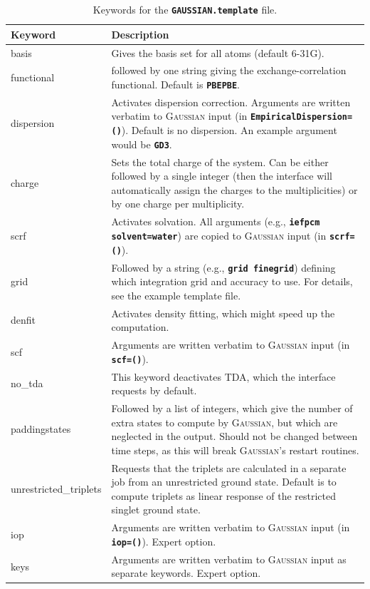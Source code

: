 \documentclass[a4paper,10pt,DIV=15,openany]{scrbook}
\newcommand{\ttt}[1]{\textbf{\texttt{#1}}}
\begin{document}
\begin{table}
  \centering
  \caption{Keywords for the \ttt{GAUSSIAN.template} file.}
  \label{tab:gauss_temp}
  \small
  \begin{tabular}{>{\ttfamily}lp{12cm}}
  \hline
  Keyword       &Description\\
  \hline
basis                   &Gives the basis set for all atoms (default 6-31G).
\\
functional              &followed by one string giving the exchange-correlation functional. Default is \ttt{PBEPBE}.
\\
dispersion              &Activates dispersion correction. Arguments are written verbatim to \textsc{Gaussian} input (in \ttt{EmpiricalDispersion=()}). Default is no dispersion. An example argument would be \ttt{GD3}.
\\
charge                  &Sets the total charge of the system. Can be either followed by a single integer (then the interface will automatically assign the charges to the multiplicities) or by one charge per multiplicity. 
\\
scrf                    &Activates solvation. All arguments (e.g., \ttt{iefpcm solvent=water}) are copied to \textsc{Gaussian} input (in \ttt{scrf=()}).
\\
grid                    &Followed by a string (e.g., \ttt{grid finegrid}) defining which integration grid and accuracy to use. For details, see the example template file.
\\
denfit                  &Activates density fitting, which might speed up the computation.
\\
scf                     &Arguments are written verbatim to \textsc{Gaussian} input (in \ttt{scf=()}).
\\
no\_tda                 &This keyword deactivates TDA, which the interface requests by default.
\\
paddingstates           &Followed by a list of integers, which give the number of extra states to compute by \textsc{Gaussian}, but which are neglected in the output. Should not be changed between time steps, as this will break \textsc{Gaussian}'s restart routines.
\\
unrestricted\_triplets  &Requests that the triplets are calculated in a separate job from an unrestricted ground state. Default is to compute triplets as linear response of the restricted singlet ground state.
\\
iop                     &Arguments are written verbatim to \textsc{Gaussian} input (in \ttt{iop=()}). Expert option.
\\
keys                    &Arguments are written verbatim to \textsc{Gaussian} input as separate keywords. Expert option.
\\
  \hline
  \end{tabular}
\end{table}
\end{document}
